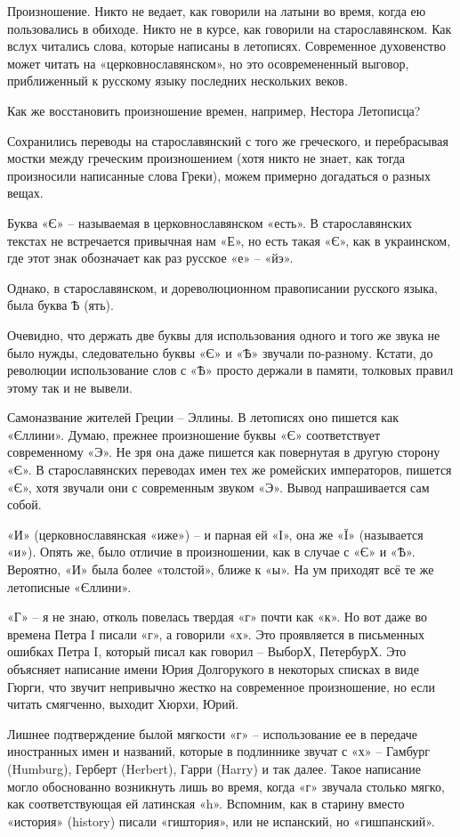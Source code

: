 Произношение. Никто не ведает, как говорили на латыни во время, когда ею пользовались в обиходе. Никто не в курсе, как говорили на старославянском. Как вслух читались слова, которые написаны в летописях. Современное духовенство может читать на «церковнославянском», но это осовремененный выговор, приближенный к русскому языку последних нескольких веков.

Как же восстановить произношение времен, например, Нестора Летописца?

Сохранились переводы на старославянский с того же греческого, и перебрасывая мостки между греческим произношением (хотя никто не знает, как тогда произносили написанные слова Греки), можем примерно догадаться о разных вещах.

Буква «Є» – называемая в церковнославянском «есть». В старославянских текстах не встречается привычная нам «Е», но есть такая «Є», как в украинском, где этот знак обозначает как раз русское «е» – «йэ».

Однако, в старославянском, и дореволюционном правописании русского языка, была буква Ѣ (ять).

Очевидно, что держать две буквы для использования одного и того же звука не было нужды, следовательно буквы «Є» и «Ѣ» звучали по-разному. Кстати, до революции использование слов с «Ѣ» просто держали в памяти, толковых правил этому так и не вывели. 

Самоназвание жителей Греции  – Эллины. В летописях оно пишется как «Єллини». Думаю, прежнее произношение буквы «Є» соответствует современному «Э». Не зря она даже пишется как повернутая в другую сторону «Є». В старославянских переводах имен тех же ромейских императоров, пишется «Є», хотя звучали они с современным звуком «Э». Вывод напрашивается сам собой.

«И» (церковнославянская «иже») – и парная ей «І», она же «Ї» (называется «и»). Опять же, было отличие в произношении, как в случае с «Є» и «Ѣ». Вероятно, «И» была более «толстой», ближе к «ы». На ум приходят всё те же летописные «Єллини».

«Г» – я не знаю, отколь повелась твердая «г» почти как «к». Но вот даже во времена Петра I писали «г», а говорили «х». Это проявляется в письменных ошибках Петра I, который писал как говорил – ВыборХ, ПетербурХ. Это объясняет написание имени Юрия Долгорукого в некоторых списках в виде Гюрги, что звучит непривычно жестко на современное произношение, но если читать смягченно, выходит Хюрхи, Юрий.

Лишнее подтверждение былой мягкости «г» – использование ее в передаче иностранных имен и названий, которые в подлиннике звучат с «х» – Гамбург (Humburg), Герберт (Herbert), Гарри (Harry) и так далее. Такое написание могло обоснованно возникнуть лишь во время, когда «г» звучала столько мягко, как соответствующая ей латинская «h». Вспомним, как в старину вместо «история» (history) писали «гиштория», или не испанский, но «гишпанский».

